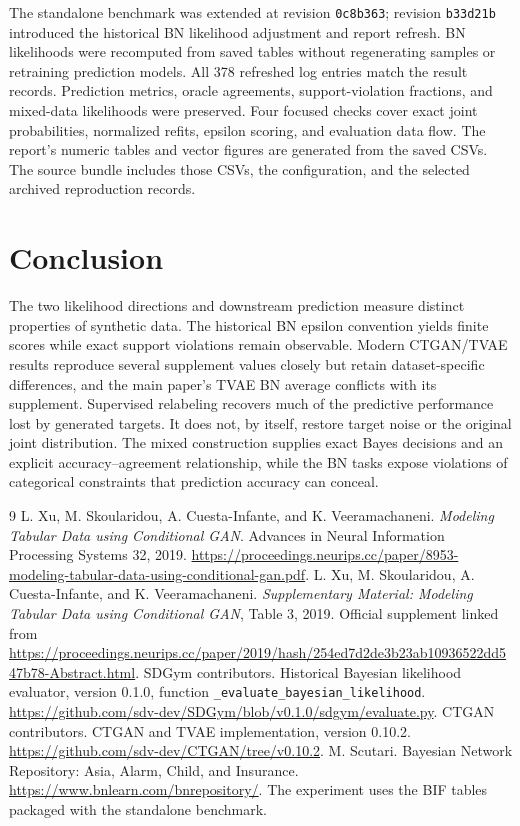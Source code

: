 \documentclass[11pt,letterpaper]{article}
\begin{document}
The standalone benchmark was extended at revision \texttt{0c8b363}; revision \texttt{b33d21b} introduced the historical BN likelihood adjustment and report refresh. BN likelihoods were recomputed from saved tables without regenerating samples or retraining prediction models. All 378 refreshed log entries match the result records. Prediction metrics, oracle agreements, support-violation fractions, and mixed-data likelihoods were preserved. Four focused checks cover exact joint probabilities, normalized refits, epsilon scoring, and evaluation data flow. The report's numeric tables and vector figures are generated from the saved CSVs. The source bundle includes those CSVs, the configuration, and the selected archived reproduction records.

\section{Conclusion}
The two likelihood directions and downstream prediction measure distinct properties of synthetic data. The historical BN epsilon convention yields finite scores while exact support violations remain observable. Modern CTGAN/TVAE results reproduce several supplement values closely but retain dataset-specific differences, and the main paper's TVAE BN average conflicts with its supplement. Supervised relabeling recovers much of the predictive performance lost by generated targets. It does not, by itself, restore target noise or the original joint distribution. The mixed construction supplies exact Bayes decisions and an explicit accuracy--agreement relationship, while the BN tasks expose violations of categorical constraints that prediction accuracy can conceal.

\begin{thebibliography}{9}
 L. Xu, M. Skoularidou, A. Cuesta-Infante, and K. Veeramachaneni. \emph{Modeling Tabular Data using Conditional GAN}. Advances in Neural Information Processing Systems 32, 2019. \url{https://proceedings.neurips.cc/paper/8953-modeling-tabular-data-using-conditional-gan.pdf}.
 L. Xu, M. Skoularidou, A. Cuesta-Infante, and K. Veeramachaneni. \emph{Supplementary Material: Modeling Tabular Data using Conditional GAN}, Table 3, 2019. Official supplement linked from \url{https://proceedings.neurips.cc/paper/2019/hash/254ed7d2de3b23ab10936522dd547b78-Abstract.html}.
 SDGym contributors. Historical Bayesian likelihood evaluator, version 0.1.0, function \texttt{\_evaluate\_bayesian\_likelihood}. \url{https://github.com/sdv-dev/SDGym/blob/v0.1.0/sdgym/evaluate.py}.
 CTGAN contributors. CTGAN and TVAE implementation, version 0.10.2. \url{https://github.com/sdv-dev/CTGAN/tree/v0.10.2}.
 M. Scutari. Bayesian Network Repository: Asia, Alarm, Child, and Insurance. \url{https://www.bnlearn.com/bnrepository/}. The experiment uses the BIF tables packaged with the standalone benchmark.
\end{thebibliography}
\end{document}
